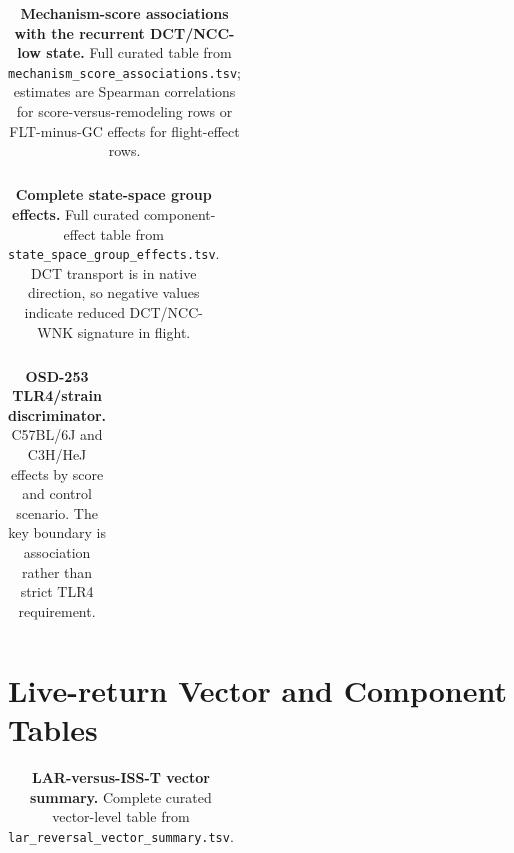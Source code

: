 \documentclass[10pt]{article}
\begin{document}
\begin{landscape}
\begingroup
\scriptsize
\setlength{\tabcolsep}{2pt}
\begin{longtable}{llllrrr}
\caption{\textbf{Mechanism-score associations with the recurrent DCT/NCC-low state.} Full curated table from \texttt{mechanism\_score\_associations.tsv}; estimates are Spearman correlations for score-versus-remodeling rows or FLT-minus-GC effects for flight-effect rows.}\label{tab:mechassoc}\\
\toprule
%
\end{longtable}
\endgroup
\end{landscape}

\begin{landscape}
\begingroup
\scriptsize
\setlength{\tabcolsep}{2pt}
\begin{longtable}{lllllllrrr}
\caption{\textbf{Complete state-space group effects.} Full curated component-effect table from \texttt{state\_space\_group\_effects.tsv}. DCT transport is in native direction, so negative values indicate reduced DCT/NCC-WNK signature in flight.}\label{tab:statefull}\\
\toprule
%
\end{longtable}
\endgroup
\end{landscape}

\begin{landscape}
\begingroup
\scriptsize
\setlength{\tabcolsep}{2pt}
\begin{longtable}{llrrrrrrl}
\caption{\textbf{OSD-253 TLR4/strain discriminator.} C57BL/6J and C3H/HeJ effects by score and control scenario. The key boundary is association rather than strict TLR4 requirement.}\label{tab:tlr4disc}\\
\toprule
%
\end{longtable}
\endgroup
\end{landscape}

\section{Live-return Vector and Component Tables}

\begin{landscape}
\begingroup
\scriptsize
\setlength{\tabcolsep}{2pt}
\begin{longtable}{lllrrrrrrrl}
\caption{\textbf{LAR-versus-ISS-T vector summary.} Complete curated vector-level table from \texttt{lar\_reversal\_vector\_summary.tsv}.}\label{tab:larvector}\\
\toprule
%
\end{longtable}
\endgroup
\end{landscape}
\end{document}
